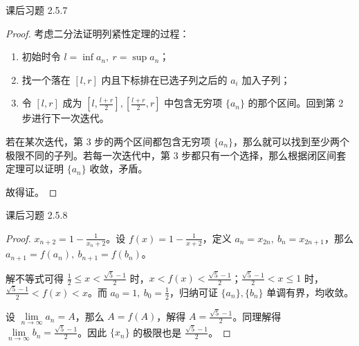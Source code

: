 \begin{problem}
	课后习题 2.5.7

	\begin{proof}
		考虑二分法证明列紧性定理的过程：

		\begin{enumerate}
			\item 初始时令 $l = \inf a_n,\ r = \sup a_n$；
			\item 找一个落在 $[l, r]$ 内且下标排在已选子列之后的 $a_i$ 加入子列；
			\item 令 $[l, r]$ 成为 $[l,\frac{l+r}{2}],[\frac{l+r}{2},r]$ 中包含无穷项 $\{a_n\}$ 的那个区间。回到第 2 步进行下一次迭代。
		\end{enumerate}

		若在某次迭代，第 3 步的两个区间都包含无穷项 $\{a_n\}$，那么就可以找到至少两个极限不同的子列。若每一次迭代中，第 3 步都只有一个选择，那么根据闭区间套定理可以证明 $\{a_n\}$ 收敛，矛盾。

		故得证。
	\end{proof}
\end{problem}

\begin{problem}
	课后习题 2.5.8

	\begin{proof}
		$x_{n+2} = 1 - \frac{1}{x_n + 2}$。设 $f(x) = 1 - \frac{1}{x + 2}$，定义 $a_n = x_{2n},\ b_n = x_{2n+1}$，那么 $a_{n+1} = f(a_n),\ b_{n+1} = f(b_n)$。

		解不等式可得 $\frac{1}{2} \le x < \frac{\sqrt{5} - 1}{2}$ 时，$x < f(x) < \frac{\sqrt{5} - 1}{2}$；$\frac{\sqrt{5} - 1}{2} < x \le 1$ 时，$\frac{\sqrt{5} - 1}{2} < f(x) < x$。而 $a_0 = 1,\ b_0 = \frac{1}{2}$，归纳可证 $\{a_n\}, \{b_n\}$ 单调有界，均收敛。

		设 $\lim\limits_{n \to \infty} a_n = A$，那么 $A = f(A)$，解得 $A = \frac{\sqrt{5} - 1}{2}$。同理解得 $\lim\limits_{n \to \infty} b_n = \frac{\sqrt{5} - 1}{2}$。因此 $\{x_n\}$ 的极限也是 $\frac{\sqrt{5} - 1}{2}$。
	\end{proof}
\end{problem}